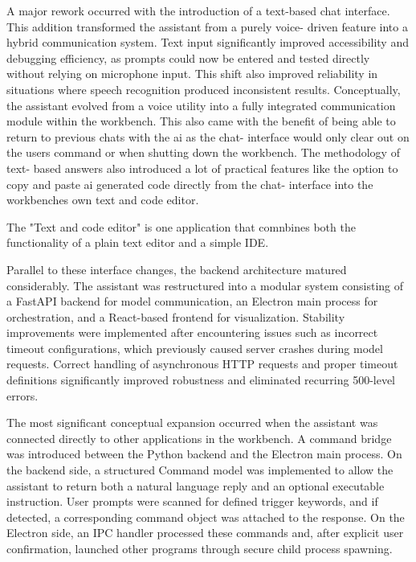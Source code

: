 \documentclass[a4paper,12pt]{article}
\begin{document}
A major rework occurred with the introduction of a text-based chat interface. This addition transformed the assistant from a purely voice- driven feature into a hybrid communication system. Text input significantly improved accessibility and debugging efficiency, as prompts could now be entered and tested directly without relying on microphone input. This shift also improved reliability in situations where speech recognition produced inconsistent results. Conceptually, the assistant evolved from a voice utility into a fully integrated communication module within the workbench. This also came with the benefit of being able to return to previous chats with the ai as the chat- interface would only clear out on the users command or when shutting down the workbench. 
The methodology of text- based answers also introduced a lot of practical features like the option to copy and paste ai generated code directly from the chat- interface into the workbenches own text and code editor. 

\begin{notebox}
The "Text and code editor" is one application that comnbines both the functionality of a plain text editor and a simple IDE. 
\end{notebox}


Parallel to these interface changes, the backend architecture matured considerably. The assistant was restructured into a modular system consisting of a FastAPI backend for model communication, an Electron\cite{electron} main process for orchestration, and a React-based frontend for visualization. Stability improvements were implemented after encountering issues such as incorrect timeout configurations, which previously caused server crashes during model requests. Correct handling of asynchronous HTTP requests and proper timeout definitions significantly improved robustness and eliminated recurring 500-level errors.

\newpage
The most significant conceptual expansion occurred when the assistant was connected directly to  other applications in the workbench. A command bridge was introduced between the Python backend and the Electron main process. On the backend side, a structured Command model was implemented to allow the assistant to return both a natural language reply and an optional executable instruction. User prompts were scanned for defined trigger keywords, and if detected, a corresponding command object was attached to the response. On the Electron side, an IPC handler processed these commands and, after explicit user confirmation, launched other programs through secure child process spawning. 
\end{document}
